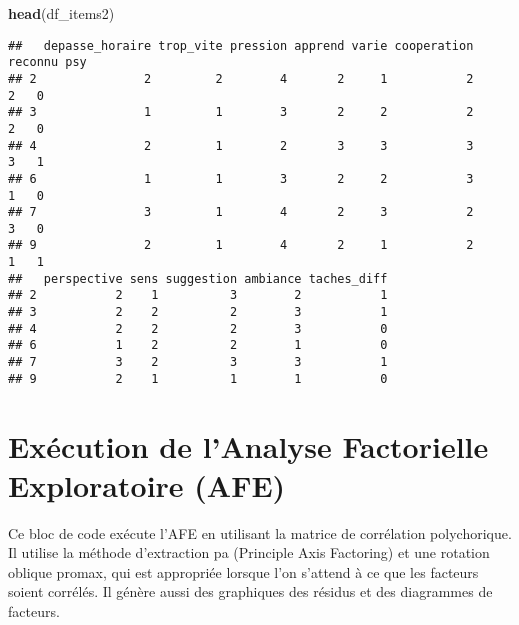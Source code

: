\documentclass[
]{article}
\newenvironment{Shaded}{\begin{snugshade}}{\end{snugshade}}
\newcommand{\FunctionTok}[1]{\textcolor[rgb]{0.13,0.29,0.53}{\textbf{#1}}}
\newcommand{\NormalTok}[1]{#1}
\begin{document}
\begin{Shaded}
\begin{Highlighting}[]
\FunctionTok{head}\NormalTok{(df\_items2)}
\end{Highlighting}
\end{Shaded}

\begin{verbatim}
##   depasse_horaire trop_vite pression apprend varie cooperation reconnu psy
## 2               2         2        4       2     1           2       2   0
## 3               1         1        3       2     2           2       2   0
## 4               2         1        2       3     3           3       3   1
## 6               1         1        3       2     2           3       1   0
## 7               3         1        4       2     3           2       3   0
## 9               2         1        4       2     1           2       1   1
##   perspective sens suggestion ambiance taches_diff
## 2           2    1          3        2           1
## 3           2    2          2        3           1
## 4           2    2          2        3           0
## 6           1    2          2        1           0
## 7           3    2          3        3           1
## 9           2    1          1        1           0
\end{verbatim}

\section{Exécution de l'Analyse Factorielle Exploratoire
(AFE)}\label{exuxe9cution-de-lanalyse-factorielle-exploratoire-afe}

Ce bloc de code exécute l'AFE en utilisant la matrice de corrélation
polychorique. Il utilise la méthode d'extraction pa (Principle Axis
Factoring) et une rotation oblique promax, qui est appropriée lorsque
l'on s'attend à ce que les facteurs soient corrélés. Il génère aussi des
graphiques des résidus et des diagrammes de facteurs.
\end{document}
